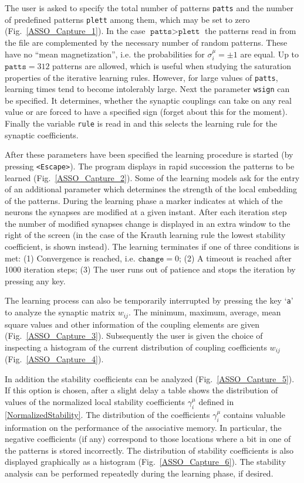 The user is asked to specify the total number of patterns \texttt{patts} and the number of predefined patterns \texttt{plett} among them, which may be set to zero (Fig.~\ref{ASSO_Capture_1}). In the case $\texttt{patts}>\texttt{plett}$ the patterns read in from the file are complemented by the necessary number of random patterns. These have no ``mean magnetization'', i.e. the probabilities for $\sigma_i^\mu=\pm1$ are equal. Up to $\texttt{patts}=312$ patterns are allowed, which is useful when studying the saturation properties of the iterative learning rules. However, for large values of \texttt{patts}, learning times tend to become intolerably large. Next the parameter \texttt{wsign} can be specified. It determines, whether the synaptic couplings can take on any real value or are forced to have a specified sign (forget about this for the moment). Finally the variable \texttt{rule} is read in and this selects the learning rule for the synaptic coefficients.

After these parameters have been specified the learning procedure is started (by pressing \texttt{<Escape>}). The program displays in rapid succession the patterns to be learned (Fig.~\ref{ASSO_Capture_2}). Some of the learning models ask for the entry of an additional parameter which determines the strength of the local embedding of the patterns. During the learning phase a marker indicates at which of the neurons the synapses are modified at a given instant. After each iteration step the number of modified synapses change is displayed in an extra window to the right of the screen (in the case of the Krauth learning rule the lowest stability coefficient, is shown instead). The learning terminates if one of three conditions is met: (1) Convergence is reached, i.e. $\texttt{change}=0$; (2) A timeout is reached after 1000 iteration steps; (3) The user runs out of patience and stops the iteration by pressing any key.

The learning process can also be temporarily interrupted by pressing the key `\texttt{a}' to analyze the synaptic matrix $w_{ij}$. The minimum, maximum, average, mean square values and other information of the coupling elements are given (Fig.~\ref{ASSO_Capture_3}). Subsequently the user is given the choice of inspecting a histogram of the current distribution of coupling coefficients $w_{ij}$ (Fig.~\ref{ASSO_Capture_4}).

In addition the stability coefficients can be analyzed (Fig.~\ref{ASSO_Capture_5}). If this option is chosen, after a slight delay a table shows the distribution of values of the normalized local stability coefficients $\gamma_i^\mu$ defined in \eqref{NormalizedStability}. The distribution of the coefficients $\gamma_i^\mu$ contains valuable information on the performance of the associative memory. In particular, the negative coefficients (if any) correspond to those locations where a bit in one of the patterns is stored incorrectly. The distribution of stability coefficients is also displayed graphically as a histogram (Fig.~\ref{ASSO_Capture_6}). The stability analysis can be performed repeatedly during the learning phase, if desired.

